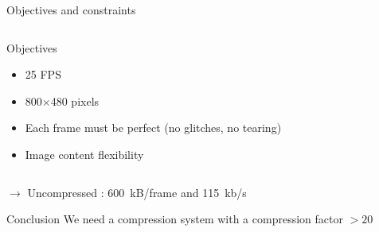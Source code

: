 \documentclass[10pt, notes]{beamer}
\begin{document}
\begin{frame}{Objectives and constraints}
    \begin{columns}
        \begin{column}{0.49\textwidth}
            \begin{exampleblock}{Objectives}
                \begin{itemize}
                    \item 25 FPS
                    \item 800$\times$480 pixels
                    \item Each frame must be perfect (no glitches, no tearing)
                    \item Image content flexibility 
                \end{itemize}
            \end{exampleblock}
        \end{column}

    \end{columns}

    $\to$ Uncompressed : \SI{600}{kB/frame} and \SI{115}{kb/s}

    \begin{block}{Conclusion}
        We need a compression system with a compression factor $> 20$      
    \end{block}
\end{frame}
\end{document}
